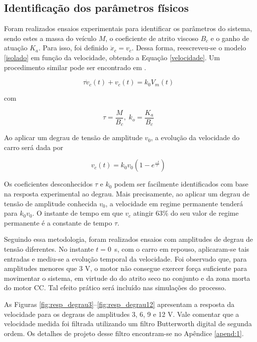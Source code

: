 \subsection{Identificação dos parâmetros físicos}
\label{identificacao}

Foram realizados ensaios experimentais para identificar os parâmetros do sistema, sendo estes a massa do veículo $M$, o coeficiente de atrito viscoso $B_c$ e o ganho de atuação $K_a$. Para isso, foi definido $\dot{x}_c=v_c$. Dessa forma, reescreveu-se o modelo \eqref{isolado} em função da velocidade, obtendo a Equação \eqref{velocidade}. Um procedimento similar pode ser encontrado em .

\begin{equation}
    \tau\dot{v}_c(t)+v_c(t)=k_0V_m(t)
    \label{velocidade}
\end{equation}

\noindent com

\begin{equation}
    \tau=\frac{M}{B_c},\;k_o=\frac{K_a}{B_c}
    \label{velocidade_parametros}
\end{equation}

Ao aplicar um degrau de tensão de amplitude $v_0$, a evolução da velocidade do carro será dada por \cite{ogata2010engenharia} 

\begin{equation}
    v_c(t)=k_0v_0(1-e^\frac{-t}{\tau})
    \label{equacao_ordem1}
\end{equation}

Os coeficientes desconhecidos $\tau$ e $k_0$ podem ser facilmente identificados com base na resposta experimental ao degrau. Mais precisamente, ao aplicar um degrau de tensão de amplitude conhecida $v_0$, a velocidade em regime permanente tenderá para $k_0v_0$.
O instante de tempo em que $v_c$ atingir 63\% do seu valor de regime permanente é a constante de tempo $\tau$.

Seguindo essa metodologia, foram realizados ensaios com amplitudes de degrau de tensão diferentes. No instante $t = 0$~s, com o carro em repouso, aplicaram-se tais entradas e mediu-se a evolução temporal da velocidade. Foi observado que, para amplitudes menores que 3 V, o motor não consegue exercer força suficiente para movimentar o sistema, em virtude do do atrito seco no conjunto e da zona morta do motor CC. Tal efeito prático será incluído nas simulações do processo. 

As Figuras \ref{fig:resp_degrau3}--\ref{fig:resp_degrau12} apresentam a resposta da velocidade para os degraus de amplitudes 3, 6, 9 e 12 V. Vale comentar que a velocidade medida foi filtrada utilizando um filtro Butterworth digital de segunda ordem. Os detalhes de projeto desse filtro encontram-se no Apêndice \ref{apend:1}.

